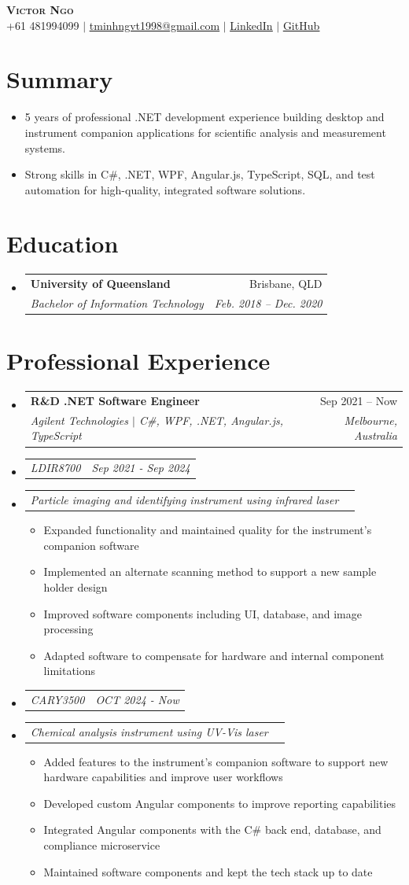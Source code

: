 \documentclass[letterpaper,11pt]{article}
\makeatletter
\newcommand{\resumeItem}[1]{
  \item\small{
    {#1 \vspace{-2pt}}
  }
}
\newcommand{\resumeSubheading}[4]{
  \vspace{-2pt}\item
    \begin{tabular*}{0.97\textwidth}[t]{l@{\extracolsep{\fill}}r}
      \textbf{#1} & #2 \\
      \textit{\small#3} & \textit{\small #4} \\
    \end{tabular*}\vspace{-7pt}
}
\newcommand{\resumeSubSubheading}[2]{
    \item
    \begin{tabular*}{0.97\textwidth}{l@{\extracolsep{\fill}}r}
      \textit{\small#1} & \textit{\small #2} \\
    \end{tabular*}\vspace{-7pt}
}
\newcommand{\resumeSubHeadingListStart}{\begin{itemize}[leftmargin=0.15in, label={}]}
\newcommand{\resumeSubHeadingListEnd}{\end{itemize}}
\newcommand{\resumeItemListStart}{\begin{itemize}}
\newcommand{\resumeItemListEnd}{\end{itemize}\vspace{-5pt}}
\makeatother
\begin{document}
\begin{center}
    \textbf{\Huge \scshape Victor Ngo} \\ \vspace{1pt}
    \small +61 481994099 $|$ \href{mailto:tminhngvt1998@gmail.com}{\underline{tminhngvt1998@gmail.com}} $|$ 
    \href{https://linkedin.com/in/victor-ngo-768366147/}{\underline{LinkedIn}} $|$
    \href{https://github.com/BrainIs404}{\underline{GitHub}}
\end{center}

\section{Summary}
  \resumeSubHeadingListStart
    \resumeItem{5 years of professional .NET development experience building desktop and instrument companion applications for scientific analysis and measurement systems.}
    \resumeItem{Strong skills in C\#, .NET, WPF, Angular.js, TypeScript, SQL, and test automation for high-quality, integrated software solutions.}
  \resumeSubHeadingListEnd

\section{Education}
  \resumeSubHeadingListStart
    \resumeSubheading
      {University of Queensland}{Brisbane, QLD}
      {Bachelor of Information Technology}{Feb. 2018 -- Dec. 2020}
  \resumeSubHeadingListEnd


\section{Professional Experience}
  \resumeSubHeadingListStart

	\resumeSubheading
       {R\&D .NET Software Engineer}{Sep 2021 -- Now}
       {Agilent Technologies $|$ \emph{C\#, WPF, .NET, Angular.js, TypeScript}}{Melbourne, Australia}
	\resumeSubSubheading
	{LDIR8700}{Sep 2021 - Sep 2024}
	\resumeSubSubheading
	{Particle imaging and identifying instrument using infrared laser}{}
       \resumeItemListStart
	\resumeItem{Expanded functionality and maintained quality for the instrument's companion software}
        \resumeItem{Implemented an alternate scanning method to support a new sample holder design}
	\resumeItem{Improved software components including UI, database, and image processing}
	\resumeItem{Adapted software to compensate for hardware and internal component limitations}
       \resumeItemListEnd
	\resumeSubSubheading
	{CARY3500}{OCT 2024 - Now}
	\resumeSubSubheading
	{Chemical analysis instrument using UV-Vis laser}{}
	\resumeItemListStart
		\resumeItem{Added features to the instrument's companion software to support new hardware capabilities and improve user workflows}
		\resumeItem{Developed custom Angular components to improve reporting capabilities}
		\resumeItem{Integrated Angular components with the C\# back end, database, and compliance microservice}
         	\resumeItem{Maintained software components and kept the tech stack up to date}
	\resumeItemListEnd
\resumeSubHeadingListEnd
\end{document}
